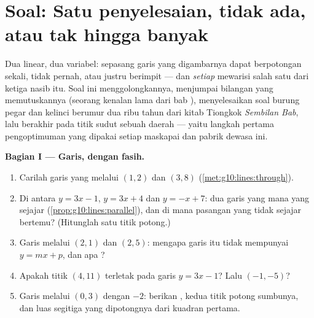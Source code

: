 \section{Soal: Satu penyelesaian, tidak ada, atau tak hingga banyak}

\begin{problem}
\label{pb:g10:lines:1}
Dua  linear, dua variabel: sepasang garis yang digambarnya
dapat berpotongan sekali, tidak pernah, atau justru berimpit --- dan
\emph{setiap}  mewarisi salah satu dari ketiga nasib
itu. Soal ini menggolongkannya, menjumpai bilangan yang memutuskannya (seorang
kenalan lama dari bab ), menyelesaikan soal burung pegar dan kelinci
berumur dua ribu tahun dari kitab Tiongkok
\emph{Sembilan Bab}, lalu berakhir pada titik sudut sebuah daerah --- yaitu
langkah pertama pengoptimuman yang dipakai setiap maskapai dan pabrik
dewasa ini.

\medskip
\noindent\textbf{Bagian I --- Garis, dengan fasih.}
\begin{enumerate}
  \item Carilah  garis yang melalui
        $(1, 2)$ dan $(3, 8)$
        (\cref{met:g10:lines:through}).
  \item Di antara $y = 3x - 1$, $y = 3x + 4$ dan $y = -x + 7$: dua
        garis yang mana yang sejajar
        (\cref{prop:g10:lines:parallel}), dan di mana pasangan yang tidak
        sejajar bertemu? (Hitunglah satu titik potong.)
  \item Garis melalui $(2, 1)$ dan $(2, 5)$: mengapa garis itu tidak
        mempunyai  $y = mx + p$, dan apa
        ?
  \item Apakah titik $(4, 11)$ terletak pada garis $y = 3x - 1$? Lalu
        $(-1, -5)$?
  \item Garis melalui $(0, 3)$ dengan  $-2$: berikan
        , kedua titik potong sumbunya, dan luas
        segitiga yang dipotongnya dari kuadran pertama.
\end{enumerate}


\end{problem}
